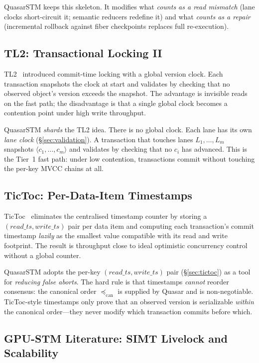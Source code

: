 QuasarSTM keeps this skeleton. It modifies what \emph{counts as a read
mismatch} (lane clocks short-circuit it; semantic reducers redefine
it) and what \emph{counts as a repair} (incremental rollback against
fiber checkpoints replaces full re-execution).

\subsection{TL2: Transactional Locking II}

TL2~\cite{dice2006tl2} introduced commit-time locking with a global
version clock. Each transaction snapshots the clock at start and
validates by checking that no observed object's version exceeds the
snapshot. The advantage is invisible reads on the fast path; the
disadvantage is that a single global clock becomes a contention point
under high write throughput.

QuasarSTM \emph{shards} the TL2 idea. There is no global clock. Each
lane has its own \emph{lane clock} (\S\ref{sec:validation}). A
transaction that touches lanes $L_1,\ldots,L_m$ snapshots
$\langle c_1,\ldots,c_m\rangle$ and validates by checking that no
$c_i$ has advanced. This is the Tier~1 fast path: under low
contention, transactions commit without touching the per-key MVCC
chains at all.

\subsection{TicToc: Per-Data-Item Timestamps}

TicToc~\cite{yu2016tictoc} eliminates the centralised timestamp
counter by storing a $(\mathit{read\_ts}, \mathit{write\_ts})$
pair per data item and computing each transaction's commit timestamp
\emph{lazily} as the smallest value compatible with its read and
write footprint. The result is throughput close to ideal optimistic
concurrency control without a global counter.

QuasarSTM adopts the per-key $(\mathit{read\_ts},
\mathit{write\_ts})$ pair (\S\ref{sec:tictoc}) as a tool for
\emph{reducing false aborts}. The hard rule is that timestamps
\emph{cannot} reorder consensus: the canonical order
$\preceq_{\mathrm{can}}$ is supplied by Quasar and is non-negotiable.
TicToc-style timestamps only prove that an observed version is
serializable \emph{within} the canonical order---they never modify
which transaction commits before which.

\subsection{GPU-STM Literature: SIMT Livelock and Scalability}

